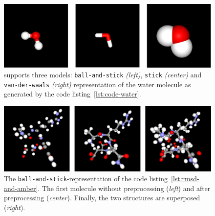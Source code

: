  \begin{figure}[t]
	\includegraphics[width=18cm]{gfx/biovis-2.png}
	\caption{\bioviz supports three models:  \texttt{ball-and-stick} \textit{(left)}, \texttt{stick} \textit{(center)} and \texttt{van-der-waals} \textit{(right)} representation of the water molecule as generated by the code listing~\ref{lst:code-water}.}
	\label{fig:biochem_water}
\end{figure}

\begin{figure}[t]
	\includegraphics[width=18cm]{gfx/biovis.png}
	\caption{The \texttt{ball-and-stick}-representation of the code listing~\ref{lst:rmsd-and-amber}. The first molecule without preprocessing (\textit{left}) and after preprocessing (\textit{center}). Finally, the two structures are superposed (\textit{right}).}
	\label{fig:biochem_visualization}
\end{figure}